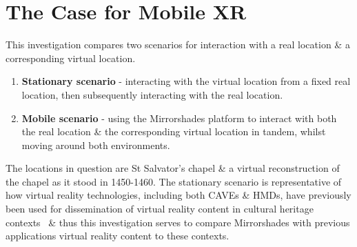 
\section{The Case for Mobile XR}
This investigation compares two scenarios for interaction with a real location \& a corresponding virtual location.

\begin{enumerate}
	\item \textbf{Stationary scenario} - interacting with the virtual location from a fixed real location, then subsequently interacting with the real location.
	\item \textbf{Mobile scenario} - using the Mirrorshades platform to interact with both the real location \& the corresponding virtual location in tandem, whilst moving around both environments.
\end{enumerate}

The locations in question are St Salvator's chapel \& a virtual reconstruction of the chapel as it stood in 1450-1460. The stationary scenario is representative of how virtual reality technologies, including both CAVEs \& HMDs, have previously been used for dissemination of virtual reality content in cultural heritage contexts~\cite{Roussou2002} \& thus this investigation serves to compare Mirrorshades with previous applications virtual reality content to these contexts.

